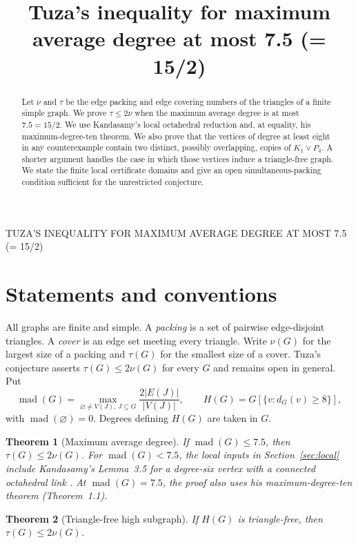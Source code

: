 \documentclass[11pt,a4paper]{amsart}
\title[Tuza's inequality for maximum average degree at most 7.5 (= 15/2)]{Tuza's inequality for maximum average degree at most 7.5 (= 15/2)}
\date{}
\newtheorem{theorem}{Theorem}
\DeclareMathOperator{\mad}{mad}
\begin{document}
\raggedbottom
\begin{abstract}
Let $\nu$ and $\tau$ be the edge packing and edge covering numbers of
the triangles of a finite simple graph. We prove $\tau\le 2\nu$ when
the maximum average degree is at most $7.5=15/2$. We use Kandasamy's
local octahedral reduction and, at equality, his maximum-degree-ten theorem. We also prove that the
vertices of degree at least eight in any counterexample contain two
distinct, possibly overlapping, copies of $K_1\vee P_4$. A shorter
argument handles the case in which those vertices induce a triangle-free
graph. We state the finite local certificate domains and give an open
simultaneous-packing condition sufficient for the unrestricted conjecture.
\end{abstract}
\maketitle
{}
         {TUZA'S INEQUALITY FOR MAXIMUM AVERAGE DEGREE AT MOST 7.5 (= 15/2)}

\section{Statements and conventions}
All graphs are finite and simple. A \emph{packing} is a set of
pairwise edge-disjoint triangles. A \emph{cover} is an edge set meeting
every triangle. Write $\nu(G)$ for the largest size of a packing and
$\tau(G)$ for the smallest size of a cover. Tuza's conjecture asserts
$\tau(G)\le 2\nu(G)$ for every $G$ and remains open in general.
Put
\[
 \mad(G)=\max_{\varnothing\ne V(J),\,J\subseteq G}
             \frac{2|E(J)|}{|V(J)|},
 \qquad H(G)=G[\{v:d_G(v)\ge 8\}],
\]
with $\mad(\varnothing)=0$. Degrees defining $H(G)$ are taken in $G$.

\begin{theorem}[Maximum average degree]\label{thm:density}
If $\mad(G)\le 7.5$, then $\tau(G)\le 2\nu(G)$.
For $\mad(G)<7.5$, the local inputs in Section~\ref{sec:local}
include Kandasamy's Lemma~3.5 for a degree-six vertex with a
connected octahedral link \cite{kandasamy}. At $\mad(G)=7.5$, the
proof also uses his maximum-degree-ten theorem (Theorem~1.1).
\end{theorem}

\begin{theorem}[Triangle-free high subgraph]\label{thm:free}
If $H(G)$ is triangle-free, then $\tau(G)\le2\nu(G)$.
\end{theorem}
\end{document}

